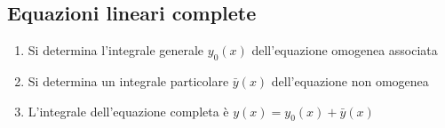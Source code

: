 \documentclass{book}
\begin{document}
\subsection{Equazioni lineari complete}
\begin{enumerate}
\item Si determina l'integrale generale $y_0(x)$ dell'equazione omogenea associata
\item Si determina un integrale particolare $\bar{y}(x)$ dell'equazione non omogenea
  \item L'integrale dell'equazione completa è $y(x)=y_0(x)+\bar{y}(x)$
\end{enumerate}

\printindex
\end{document}
